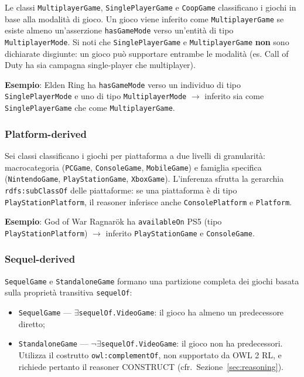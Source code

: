 Le classi \texttt{MultiplayerGame}, \texttt{SinglePlayerGame} e \texttt{CoopGame}
classificano i giochi in base alla modalit\`a di gioco. Un gioco viene inferito
come \texttt{MultiplayerGame} se esiste almeno un'asserzione \texttt{hasGameMode}
verso un'entit\`a di tipo \texttt{MultiplayerMode}. Si noti che \texttt{SinglePlayerGame}
e \texttt{MultiplayerGame} \textbf{non} sono dichiarate disgiunte: un gioco pu\`o
supportare entrambe le modalit\`a (es. Call of Duty ha sia campagna single-player
che multiplayer).

\textbf{Esempio}: Elden Ring ha \texttt{hasGameMode} verso un individuo di tipo
\texttt{SinglePlayerMode} e uno di tipo \texttt{MultiplayerMode} $\rightarrow$ inferito sia come
\texttt{SinglePlayerGame} che come \texttt{MultiplayerGame}.

\subsubsection{Platform-derived}

Sei classi classificano i giochi per piattaforma a due livelli di granularit\`a:
macrocategoria (\texttt{PCGame}, \texttt{ConsoleGame}, \texttt{MobileGame}) e
famiglia specifica (\texttt{NintendoGame}, \texttt{PlayStationGame}, \texttt{XboxGame}).
L'inferenza sfrutta la gerarchia \texttt{rdfs:subClassOf} delle piattaforme: se
una piattaforma \`e di tipo \texttt{PlayStationPlatform}, il reasoner inferisce
anche \texttt{ConsolePlatform} e \texttt{Platform}.

\textbf{Esempio}: God of War Ragnar\"ok ha \texttt{availableOn} PS5 (tipo
\texttt{PlayStationPlatform}) $\rightarrow$ inferito \texttt{PlayStationGame} e \texttt{ConsoleGame}.

\subsubsection{Sequel-derived}

\texttt{SequelGame} e \texttt{StandaloneGame} formano una partizione completa
dei giochi basata sulla propriet\`a transitiva \texttt{sequelOf}:
\begin{itemize}[nosep]
  \item \texttt{SequelGame} --- $\exists$\texttt{sequelOf.VideoGame}: il gioco ha
    almeno un predecessore diretto;
  \item \texttt{StandaloneGame} --- $\neg\exists$\texttt{sequelOf.VideoGame}: il
    gioco non ha predecessori. Utilizza il costrutto \texttt{owl:complementOf},
    non supportato da OWL 2 RL, e richiede pertanto il reasoner CONSTRUCT
    (cfr.~Sezione~\ref{sec:reasoning}).
\end{itemize}

